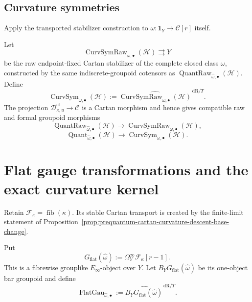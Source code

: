 \subsection{Curvature symmetries}
\label{subsec:prequantum-curvature-symmetries}

Apply the transported stabilizer construction to
$\omega:\mathbf1_Y\to\mathscr C[r]$ itself.

\begin{definition}
\label{def:prequantum-curvature-symmetry-groupoid}
Let
\[
\operatorname{CurvSymRaw}_{\omega,\bullet}(\mathcal H)
\rightrightarrows Y
\]
be the raw endpoint-fixed Cartan stabilizer of the complete closed class $\omega$,
constructed by the same indiscrete-groupoid cotensors as
$\operatorname{QuantRaw}_{\widehat\omega,\bullet}(\mathcal H)$.  Define
\[
\boxed{
\operatorname{CurvSym}_{\omega,\bullet}(\mathcal H)
:=
\widehat{\operatorname{CurvSymRaw}_{\omega,\bullet}(\mathcal H)}^{\,\mathrm{dR}/T}.
}
\]
The projection
$\mathscr D^{\mathrm{cl}}_{\kappa,u}\to\mathscr C$ is a Cartan morphism and hence
gives compatible raw and formal groupoid morphisms
\[
\boxed{
\operatorname{QuantRaw}_{\widehat\omega,\bullet}(\mathcal H)
\longrightarrow
\operatorname{CurvSymRaw}_{\omega,\bullet}(\mathcal H),
}
\]
\[
\boxed{
\operatorname{Quant}_{\widehat\omega,\bullet}(\mathcal H)
\longrightarrow
\operatorname{CurvSym}_{\omega,\bullet}(\mathcal H).
}
\]
\end{definition}

\section{Flat gauge transformations and the exact curvature kernel}
\label{sec:prequantum-flat-gauge-kernel}

Retain $\mathscr F_\kappa=\operatorname{fib}(\kappa)$.  Its stable Cartan transport
is created by the finite-limit statement of
Proposition~\ref{prop:prequantum-cartan-curvature-descent-base-change}.

\begin{definition}
\label{def:prequantum-flat-gauge-groupoid}
Put
\[
G_{\mathrm{flat}}(\widehat\omega)
:=
\Omega_Y^\infty\mathscr F_\kappa[r-1].
\]
This is a fibrewise grouplike $E_\infty$-object over $Y$.  Let
$B_YG_{\mathrm{flat}}(\widehat\omega)$ be its one-object bar groupoid and define
\[
\boxed{
\operatorname{FlatGau}_{\widehat\omega,\bullet}
:=
\widehat{B_YG_{\mathrm{flat}}(\widehat\omega)}^{\,\mathrm{dR}/T}.
}
\]
\end{definition}

